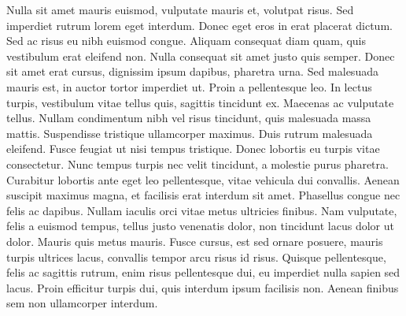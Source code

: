 \documentclass{article}
\begin{document}
Nulla sit amet mauris euismod, vulputate mauris et, volutpat risus. Sed imperdiet rutrum lorem eget interdum. Donec eget eros in erat placerat dictum. Sed ac risus eu nibh euismod congue. Aliquam consequat diam quam, quis vestibulum erat eleifend non. Nulla consequat sit amet justo quis semper. Donec sit amet erat cursus, dignissim ipsum dapibus, pharetra urna. Sed malesuada mauris est, in auctor tortor imperdiet ut. Proin a pellentesque leo. In lectus turpis, vestibulum vitae tellus quis, sagittis tincidunt ex. Maecenas ac vulputate tellus. Nullam condimentum nibh vel risus tincidunt, quis malesuada massa mattis.
Suspendisse tristique ullamcorper maximus. Duis rutrum malesuada eleifend. Fusce feugiat ut nisi tempus tristique. Donec lobortis eu turpis vitae consectetur. Nunc tempus turpis nec velit tincidunt, a molestie purus pharetra. Curabitur lobortis ante eget leo pellentesque, vitae vehicula dui convallis. Aenean suscipit maximus magna, et facilisis erat interdum sit amet. Phasellus congue nec felis ac dapibus. Nullam iaculis orci vitae metus ultricies finibus. Nam vulputate, felis a euismod tempus, tellus justo venenatis dolor, non tincidunt lacus dolor ut dolor. Mauris quis metus mauris. Fusce cursus, est sed ornare posuere, mauris turpis ultrices lacus, convallis tempor arcu risus id risus. Quisque pellentesque, felis ac sagittis rutrum, enim risus pellentesque dui, eu imperdiet nulla sapien sed lacus. Proin efficitur turpis dui, quis interdum ipsum facilisis non. Aenean finibus sem non ullamcorper interdum.
\end{document}
